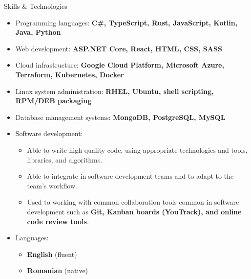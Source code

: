 \documentclass[a4paper]{mcdowellcv}
\begin{document}
\begin{cvsection}{Skills \& Technologies}
	\begin{cvsubsection}{}{}{}
		\begin{itemize}
			\item Programming languages: \textbf{C\#, TypeScript, Rust, JavaScript, Kotlin, Java, Python}
			\item Web development: \textbf{ASP.NET Core, React, HTML, CSS, SASS}
			\item Cloud infrastructure: \textbf{Google Cloud Platform, Microsoft Azure, Terraform, Kubernetes, Docker}
			\item Linux system administration: \textbf{RHEL, Ubuntu, shell scripting, RPM/DEB packaging}
			\item Database management systems: \textbf{MongoDB, PostgreSQL, MySQL}
			\item Software development:
			      \begin{itemize}
				      \item Able to write high-quality code, using appropriate technologies and tools, libraries,
				            and algorithms.
				      \item Able to integrate in software development teams and to adapt to the team's workflow.
				      \item Used to working with common collaboration tools common in software development such as \textbf{Git,
					            Kanban boards (YouTrack), and online code review tools}.
			      \end{itemize}
			\item Languages:
			      \begin{itemize}
				      \item \textbf{English} (fluent)
				      \item \textbf{Romanian} (native)
			      \end{itemize}
		\end{itemize}
	\end{cvsubsection}
\end{cvsection}
\end{document}
